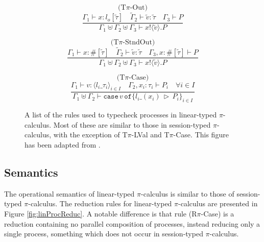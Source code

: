 \documentclass{l4proj}
\begin{document}
\begin{figure}[H]
\begin{subfigure}{0.48\textwidth}
\vspace{\fill}
\end{subfigure}
\begin{subfigure}{0.48\textwidth}
\[\text{(T}\pi\text{-Out)}\]
\[\frac{\Gamma_{1} \vdash x : l_{o}[\tilde{\tau}] \quad \tilde{\Gamma}_{2} \vdash \tilde{v} : \tilde{\tau} \quad \Gamma_{3} \vdash P}{\Gamma_{1} \uplus \Gamma_{2} \uplus \Gamma_{3} \vdash x\texttt{!} \langle \tilde{v} \rangle .P}\]
\vspace{\fill}
\end{subfigure}
\begin{subfigure}{0.48\textwidth}
\[\text{(T}\pi\text{-StndOut)}\]
\[\frac{\Gamma_{1} \vdash x : \#[\tilde{\tau}] \quad \tilde{\Gamma}_{2} \vdash \tilde{v} : \tilde{\tau} \quad \Gamma_{3}, x : \#[\tilde{\tau}] \vdash P}{\Gamma_{1} \uplus \Gamma_{2} \uplus \Gamma_{3} \vdash x\texttt{!} \langle \tilde{v} \rangle .P}\]
\vspace{\fill}
\end{subfigure}
\begin{subfigure}{\textwidth}
\[\text{(T}\pi\text{-Case)}\]
\[\frac{\Gamma_{1} \vdash v : \langle l_{i}\_\tau_{i}\rangle_{i \in I} \quad \Gamma_{2}, x_{i} : \tau_{i} \vdash P_{i} \quad \forall i \in I}{\Gamma_{1} \uplus \Gamma_{2}  \vdash \texttt{case}\,v\,\texttt{of}\{l_{i}\_(x_{i})\,\triangleright\,P_{i}\}_{i \in I} }\]
\vspace{\fill}
\end{subfigure}
\caption{A list of the rules used to typecheck processes in linear-typed $\pi$-calculus. Most of these are similar to those in session-typed $\pi$-calculus, with the exception of T$\pi$-LVal and T$\pi$-Case. This figure has been adapted from \citet{DARDHA2017253}.}
\label{fig:linProcType}
\end{figure}

\subsection{Semantics}
\label{bgLinSem}

\quad The operational semantics of linear-typed $\pi$-calculus is similar to those of session-typed $\pi$-calculus. The reduction rules for linear-typed $\pi$-calculus are presented in Figure \ref{fig:linProcReduc}. A notable difference is that rule (R$\pi$-Case) is a reduction containing no parallel composition of processes, instead reducing only a single process, something which does not occur in session-typed $\pi$-calculus.
\end{document}
